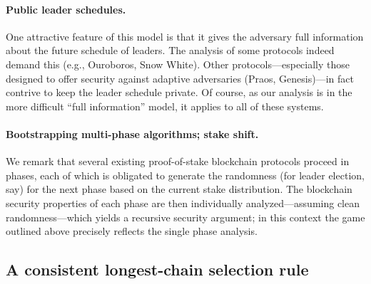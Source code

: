   \paragraph{Public leader schedules.} One attractive feature of this
  model is that it gives the adversary full information about the future
  schedule of leaders. The analysis of some protocols indeed demand this
  (e.g., Ouroboros, Snow White). Other protocols---especially those
  designed to offer security against adaptive adversaries (Praos,
  Genesis)---in fact contrive to keep the leader schedule private. Of
  course, as our analysis is in the more difficult ``full information''
  model, it applies to all of these systems.

  \paragraph{Bootstrapping multi-phase algorithms; stake shift.} We remark that
  several existing proof-of-stake blockchain protocols proceed in
  phases, each of which is obligated to generate the randomness (for
  leader election, say) for the next phase based on the current stake
  distribution. The blockchain security properties of each phase are
  then individually analyzed---assuming clean randomness---which yields
  a recursive security argument; in this context the game outlined above
  precisely reflects the single phase analysis.





\subsection{A consistent longest-chain selection rule}\label{sec:lcr-model} 

